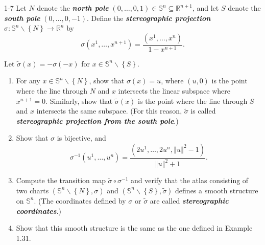 \begin{problem}{1-7}
    Let \( N \) denote the \textbf{\emph{north pole}} \( (0, \ldots, 0, 1) \in \mathbb{S}^{n} \subseteq \mathbb{R}^{n+1} \), and let \( S \) denote the \textbf{\emph{south pole}} \( (0, \ldots, 0, -1) \). Define the \textbf{\emph{stereographic projection}} \( \sigma: \mathbb{S}^{n} \smallsetminus \left\{N\right\} \to \mathbb{R}^{n} \) by
    \[
        \sigma(x^{1}, \ldots, x^{n+1}) = \dfrac{(x^{1}, \ldots, x^{n})}{1 - x^{n+1}}.
    \]

    Let \( \widetilde{\sigma}(x) = -\sigma(-x) \) for \( x \in \mathbb{S}^{n} \smallsetminus \left\{S\right\} \).

    \begin{enumerate}[itemsep=0pt,label={(\alph*)}]
        \item For any \( x \in \mathbb{S}^{n} \smallsetminus \left\{N\right\} \), show that \( \sigma(x) = u \), where \( (u, 0) \) is the point where the line through \( N \) and \( x \) intersects the linear subspace where \( x^{n+1} = 0 \). Similarly, show that \( \widetilde{\sigma}(x) \) is the point where the line through \( S \) and \( x \) intersects the same subspace. (For this reason, \( \widetilde{\sigma} \) is called \textbf{\emph{stereographic projection from the south pole}}.)
        \item Show that \( \sigma \) is bijective, and
              \[
                  \sigma^{-1}(u^{1}, \ldots, u^{n}) = \dfrac{(2u^{1}, \ldots, 2u^{n}, {\left\Vert u \right\Vert}^{2} - 1)}{{\left\Vert u \right\Vert}^{2} + 1}.
              \]
        \item Compute the transition map \( \widetilde{\sigma} \circ \sigma^{-1} \) and verify that the atlas consisting of two charts \( (\mathbb{S}^{n} \smallsetminus \left\{N\right\}, \sigma) \) and \( (\mathbb{S}^{n} \smallsetminus \left\{S\right\}, \widetilde{\sigma}) \) defines a smooth structure on \( \mathbb{S}^{n} \). (The coordinates defined by \( \sigma \) or \( \widetilde{\sigma} \) are called \textbf{\emph{stereographic coordinates}}.)
        \item Show that this smooth structure is the same as the one defined in Example 1.31.
    \end{enumerate}
\end{problem}

